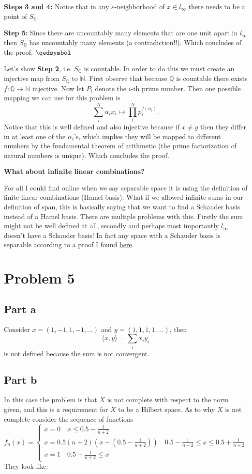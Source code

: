 \documentclass[12pt]{article}%
\begin{document}
\textbf{Steps 3 and 4:} Notice that in any $\varepsilon$-neighborhood of $x\in
l_\infty$ there needs to be a point of $S_\mathbb{Q}$.

\textbf{Step 5:} Since there are uncountably many elements that are one unit
apart in $l_\infty$ then $S_\mathbb{Q}$ has uncountably many elements (a
contradiction!!). Which concludes of the proof. $\qedsymbol$

Let's show \textbf{Step 2}, i.e. $S_\mathbb{Q}$ is countable. In order to do this we must
create an injective map from $S_\mathbb{Q}$ to $\mathbb{N}$. First observe
that because $\mathbb{Q}$ is countable there exists $f:\mathbb{Q}\to\mathbb{N}$
injective. Now let $P_i$ denote the $i$-th prime number. Then one possible
mapping we can use for this problem is
\[
	\sum_i^N \alpha_ix_i \mapsto \prod_i^N p_i^{f(\alpha_i)}.
\]
Notice that this is well defined and also injective because if $x\neq y$ then
they differ in at least one of the $\alpha_i$'s, which implies they will be
mapped to different numbers by the fundamental theorem of arithmetic (the prime
factorization of natural numbers is unique). Which concludes the proof. \qedsymbol

\textbf{What about infinite linear combinations?}

For all I could find online when we say separable space it is using the
definition of finite linear combinations (Hamel basis).
What if we allowed infinite sums in our definition of span, this is basically
saying that we want to find a Schauder basis instead of a Hamel basis. There
are multiple problems with this. Firstly the sum might not be well defined at
all, secondly and perhaps most importantly $l_\infty$ doesn't have a Schauder
basis! In fact any space with a Schauder basis is separable according to a
proof I found \underline{\href{https://math.stackexchange.com/questions/297851/how-to-prove-that-if-a-normed-space-has-schauder-basis-then-it-is-separable-wh}{here}}.
\section*{Problem 5}
\subsection*{Part a}
Consider $x=(1,-1,1,-1,\dots)$ and $y=(1,1,1,1,\dots)$, then
\[
	\langle x,y \rangle=\sum_ix_iy_i
\]
is not defined because the sum is not convergent.
\subsection*{Part b}
In this case the problem is that $X$ is not complete with respect
to the norm given, and this is a requirement for $X$ to be a
Hilbert space. As to why $X$ is not complete consider the sequence
of functions
\[
	f_n(x)=\begin{cases}
		x=0 \quad x\leq0.5-\frac{1}{n+2}\\
		x=0.5(n+2)(x-(0.5-\frac{1}{n+2})) \quad 0.5-\frac{1}{n+2}\leq x \leq 0.5 +\frac{1}{n+2}\\
		x=1 \quad 0.5 +\frac{1}{n+2} \leq x
		\end{cases}
\]
They look like:
\end{document}
